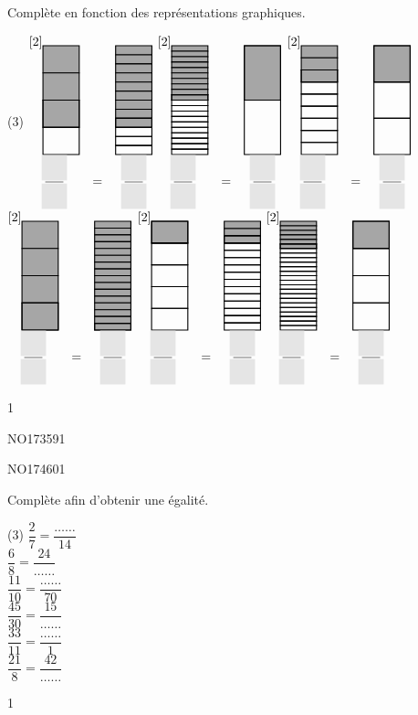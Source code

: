 \documentclass[a4paper,12pt]{report}
\begin{document}
\begin{exop}{
Complète en fonction des représentations graphiques.

\vspace{-1cm}
\begin{tasks}[after-item-skip = -0.4em](3)
	\task $\begin{matrix}[2]\vfracrect[xscale=3]{3}{4} && \vfracrect[xscale=3]{9}{12}\\
	\emptyfrac&=&\emptyfrac 
\end{matrix}$
	\task $\begin{matrix}[2]\vfracrect[xscale=3]{10}{20} && \vfracrect[xscale=3]{1}{2}\\
	\emptyfrac&=&\emptyfrac 
\end{matrix}$
	\task $\begin{matrix}[2]\vfracrect[xscale=3]{3}{9} && \vfracrect[xscale=3]{1}{3}\\
	\emptyfrac&=&\emptyfrac 
\end{matrix}$
	\task $\begin{matrix}[2]\vfracrect[xscale=3]{4}{4} && \vfracrect[xscale=3]{16}{16}\\
	\emptyfrac&=&\emptyfrac
\end{matrix}$
	\task $\begin{matrix}[2]\vfracrect[xscale=3]{1}{5} && \vfracrect[xscale=3]{3}{15}\\
	\emptyfrac&=&\emptyfrac
\end{matrix}$
	\task $\begin{matrix}[2]\vfracrect[xscale=3]{6}{24} && \vfracrect[xscale=3]{1}{4}\\
	\emptyfrac&=&\emptyfrac 
\end{matrix}$
\end{tasks}
}{1}\end{exop}



\begin{exof}{NO173}{59}{1}
\end{exof}
\begin{exof}{NO174}{60}{1}
\end{exof}

\begin{exop}{
Complète afin d'obtenir une égalité.
\begin{tasks}[after-item-skip = 0.2em, after-skip=-1em](3)
    \task $\dfrac{2}{7}=\dfrac{\ldots\ldots}{14}$\\
    \task $\dfrac{6}{8}=\dfrac{24}{\ldots\ldots}$\\
    \task $\dfrac{11}{10}=\dfrac{\ldots\ldots}{70}$\\
    \task $\dfrac{45}{30}=\dfrac{15}{\ldots\ldots}$\\
    \task $\dfrac{33}{11}=\dfrac{\ldots\ldots}{1}$\\
    \task $\dfrac{21}{8}=\dfrac{42}{\ldots\ldots}$\\
\end{tasks}
}{1}\end{exop}
\end{document}
